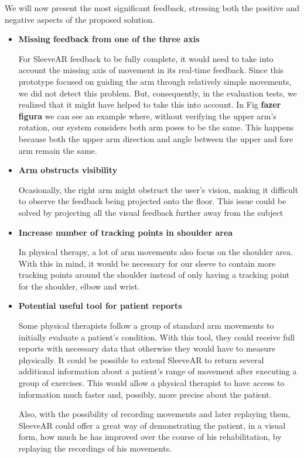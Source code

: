 We will now present the most significant feedback, stressing both the positive and negative aspects of the proposed solution.


\begin{itemize}
\item \textbf{Missing feedback from one of the three axis}

For SleeveAR feedback to be fully complete, it would need to take into account the missing axis of movement in its real-time feedback. Since this prototype focused on guiding the arm through relatively simple movements, we did not detect this problem. But, consequently, in the evaluation tests, we realized that it might have helped to take this into account. In Fig \textbf{fazer figura} we can see an example where, without verifying the upper arm's rotation, our system considers both arm poses to be the same. This happens because both the upper arm direction and angle between the upper and fore arm remain the same.


\item \textbf{Arm obstructs visibility}

Ocasionally, the right arm might obstruct the user's vision, making it difficult to observe the feedback being projected onto the floor. This issue could be solved by projecting all the visual feedback further away from the subject

\item \textbf{Increase number of tracking points in shoulder area}

In physical therapy, a lot of arm movements also focus on the shoulder area. With this in mind, it would be necessary for our sleeve to contain more tracking points around the shoulder instead of only having a tracking point for the shoulder, elbow and wrist.

\item \textbf{Potential useful tool for patient reports}

Some physical therapists follow a group of standard arm movements to initially evaluate a patient's condition. With this tool, they could receive full reports with necessary data that otherwise they would have to measure physically. It could be possible to extend SleeveAR to return several additional information about a patient's range of movement after executing a group of exercises. This would allow a physical therapist to have access to information much faster and, possibly, more precise about the patient. 

Also, with the possibility of recording movements and later replaying them, SleeveAR could offer a great way of demonstrating the patient, in a visual form, how much he has improved over the course of his rehabilitation, by replaying the recordings of his movements.


\end{itemize}

